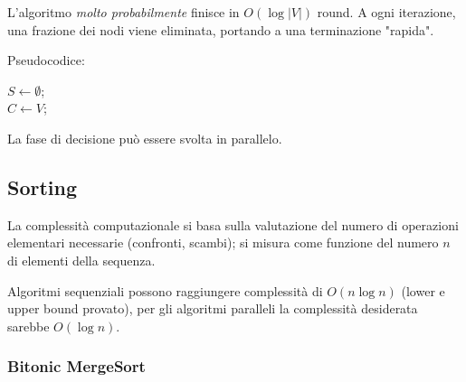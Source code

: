L'algoritmo \textit{molto probabilmente} finisce in $O(\log |V|)$ round. A ogni iterazione, una frazione dei nodi viene eliminata, portando a una terminazione "rapida".

Pseudocodice:
\begin{center}
    \begin{minipage}{.63\textwidth}
        \begin{tcolorbox}[
            colback=white,
            sharp corners,
            boxrule=.3mm,
            left=20pt,
            top=0pt,
            bottom=0pt,
            colbacktitle=white,
            coltitle=black
            ]
            \LinesNumbered
            \begin{algorithm}[H]
                \SetAlgoNoEnd
                $S \leftarrow \emptyset$; \\
                $C \leftarrow V$; \\
            \end{algorithm}
        \end{tcolorbox}
    \end{minipage}
\end{center}

La fase di decisione può essere svolta in parallelo.

\subsection{Sorting}

La complessità computazionale si basa sulla valutazione del numero di operazioni elementari necessarie (confronti, scambi); si misura come funzione del numero $n$ di elementi della sequenza.

Algoritmi sequenziali possono raggiungere complessità di $O (n \log n)$ (lower e upper bound provato), per gli algoritmi paralleli la complessità desiderata sarebbe $O (\log n)$.

\subsubsection{Bitonic MergeSort}

